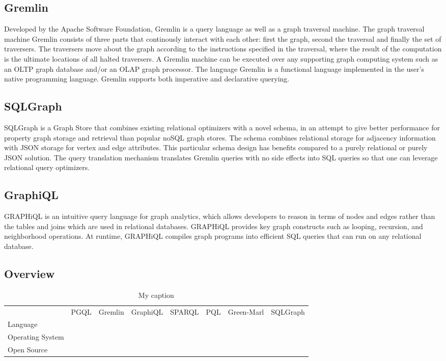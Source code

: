 \documentclass[11pt,singlecolumn]{scrartcl}
\begin{document}
\subsection{Gremlin}
Developed by the Apache Software Foundation, Gremlin is a query language as well as a graph traversal machine. The graph traversal machine Gremlin consists of three parts that continously interact with each other: first the graph, second the traversal and finally the set of traversers. The traversers move about the graph according to the instructions specified in the traversal, where the result of the computation is the ultimate locations of all halted traversers. A Gremlin machine can be executed over any supporting graph computing system such as an OLTP graph database and/or an OLAP graph processor. The language Gremlin is a functional language implemented in the user’s native programming language. Gremlin supports both imperative and declarative querying.
\cite{Gremlin}


\subsection{SQLGraph}
SQLGraph is a Graph Store that combines existing relational optimizers with a novel schema, in an attempt to give better performance for property graph storage and retrieval than popular noSQL graph stores. The schema combines relational storage for adjacency information with JSON storage for vertex and edge attributes. This particular schema design has benefits compared to a purely relational or purely JSON solution. The query translation mechanism translates Gremlin queries with no side effects into SQL queries so that one can leverage relational query optimizers. \cite{Sun:2015}


\subsection{GraphiQL}
GRAPHiQL is an intuitive query language for graph analytics, which allows developers to reason in terms of nodes and edges rather than the tables and joins which are used in relational databases. GRAPHiQL provides key graph constructs such as looping, recursion, and neighborhood operations. At runtime, GRAPHiQL compiles graph programs into efficient SQL queries that can run on any relational database. \cite {Graphiql}
\subsection{Overview}
\begin{table}[]
\centering
\caption{My caption}
\label{my-label}
\begin{tabular}{llllllll}
                 & PGQL & Gremlin & GraphiQL & SPARQL & PQL & Green-Marl & SQLGraph \\
Language         &      &         &          &          &          &          &      \\
Operating System &      &         &          &          &          &          &    \\
Open Source      &      &         &          &          &          &          &
\end{tabular}
\end{table}
\clearpage
\end{document}
